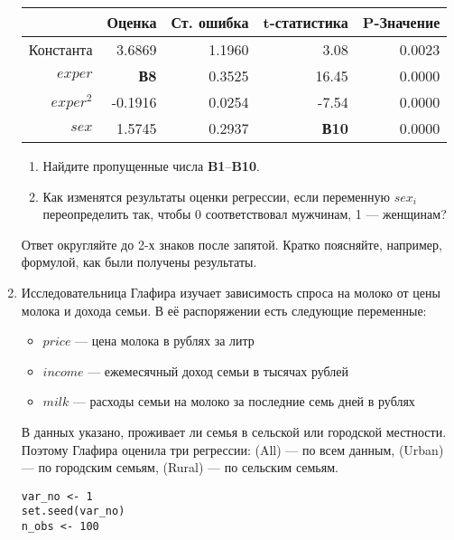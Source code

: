 \documentclass[12pt, a4paper]{article}
\theoremstyle{definition}
\begin{document}
\begin{enumerate}
\begin{table}[ht]
\centering
\begin{tabular}{rrrrr}
  \hline
 & Оценка & Ст. ошибка & t-статистика & P-Значение \\
  \hline
Константа & 3.6869 & 1.1960 & 3.08 & 0.0023 \\
  $exper$ & \textbf{В8} & 0.3525 & 16.45 & 0.0000 \\
  $exper^2$ & -0.1916 & 0.0254 & -7.54 & 0.0000 \\
  $sex$ & 1.5745 & 0.2937 & \textbf{В10} & 0.0000 \\
   \hline
\end{tabular}
\end{table}



\begin{enumerate}
\item Найдите пропущенные числа \textbf{B1}--\textbf{B10}.

\item Как изменятся результаты оценки регрессии, если переменную $sex_i$ переопределить так, чтобы 0 соответствовал мужчинам, 1 — женщинам?
\end{enumerate}

Ответ округляйте до 2-х знаков после запятой. Кратко поясняйте, например, формулой, как были получены результаты.

\item Исследовательница Глафира изучает зависимость спроса на молоко от цены молока и дохода семьи. В её распоряжении есть следующие переменные:

\begin{itemize}
\item $price$ — цена молока в рублях за литр
\item $income$ — ежемесячный доход семьи в тысячах рублей
\item $milk$ — расходы семьи на молоко за последние семь дней в рублях
\end{itemize}

В данных указано, проживает ли семья в сельской или городской местности. Поэтому Глафира оценила три регрессии: (All) — по всем данным, (Urban) — по городским семьям, (Rural) — по сельским семьям.

\begin{verbatim}
var_no <- 1
set.seed(var_no)
n_obs <- 100


\end{verbatim}
\end{enumerate}
\end{document}
